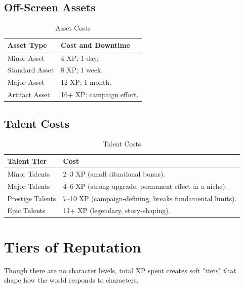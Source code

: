 \subsection{Off‑Screen Assets}\label{subsec:off_screen_assets_costs}

\begin{longtable}{p{3.5cm} p{9cm}}
\caption{Asset Costs}\label{tab:asset_costs}\\
\toprule
\textbf{Asset Type} & \textbf{Cost and Downtime} \\
\midrule
Minor Asset & 4 XP; 1 day. \\
Standard Asset & 8 XP; 1 week. \\
Major Asset & 12 XP; 1 month. \\
Artifact Asset & 16+ XP; campaign effort. \\
\bottomrule
\end{longtable}

\subsection{Talent Costs}\label{subsec:talent_costs}

\begin{longtable}{p{3.5cm} p{9cm}}
\caption{Talent Costs}\label{tab:talent_costs}\\
\toprule
\textbf{Talent Tier} & \textbf{Cost} \\
\midrule
Minor Talents & 2--3 XP (small situational bonus). \\
Major Talents & 4--6 XP (strong upgrade, permanent effect in a niche). \\
Prestige Talents & 7--10 XP (campaign‑defining, breaks fundamental limits). \\
Epic Talents & 11+ XP (legendary, story‑shaping). \\
\bottomrule
\end{longtable}

\section{Tiers of Reputation}\label{sec:reputation_tiers}

Though there are no character levels, total XP spent creates soft "tiers" that shape how the world responds to characters.

